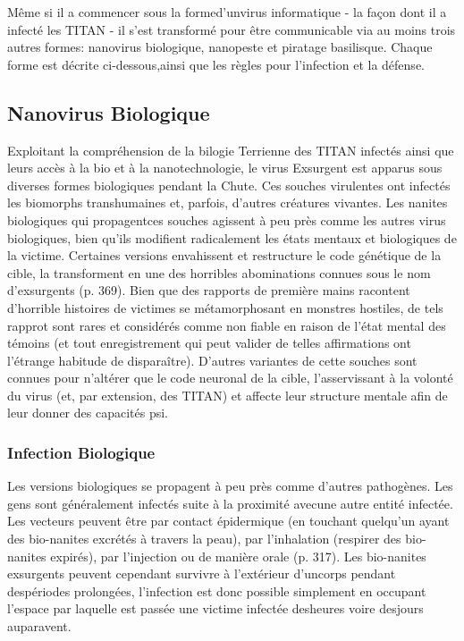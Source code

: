 Même si il a commencer sous la formed'unvirus informatique - la façon dont il a infecté les TITAN - il s'est transformé pour être communicable via au moins trois autres formes: nanovirus biologique, nanopeste et piratage basilisque. Chaque forme est décrite ci-dessous,ainsi que les règles pour l'infection et la défense. 

\subsection{Nanovirus Biologique} 

Exploitant la compréhension de la bilogie Terrienne des TITAN infectés ainsi que leurs accès à la bio et à la nanotechnologie, le virus Exsurgent est apparus sous diverses formes biologiques pendant la Chute. Ces souches virulentes ont infectés les biomorphs transhumaines et, parfois, d'autres créatures vivantes. Les nanites biologiques qui propagentces souches agissent à peu près comme les autres virus biologiques, bien qu'ils modifient radicalement les états mentaux et biologiques de la victime. Certaines versions envahissent et restructure le code génétique de la cible, la transforment en une des horribles abominations connues sous le nom d'exsurgents (p. 369). Bien que des rapports de première mains racontent d'horrible histoires de victimes se métamorphosant en monstres hostiles, de tels rapprot sont rares et considérés comme non fiable en raison de l'état mental des témoins (et tout enregistrement qui peut valider de telles affirmations ont l'étrange habitude de disparaître). D'autres variantes de cette souches sont connues pour n'altérer que le code neuronal de la cible, l'asservissant à la volonté du virus (et, par extension, des TITAN) et affecte leur structure mentale afin de leur donner des capacités psi. 

\subsubsection{Infection Biologique} 

Les versions biologiques se propagent à peu près comme d'autres pathogènes. Les gens sont généralement infectés suite à la proximité avecune autre entité infectée. Les vecteurs peuvent être par contact épidermique (en touchant quelqu'un ayant des bio-nanites excrétés à travers la peau), par l'inhalation (respirer des bio-nanites expirés), par l'injection ou de manière orale (p. 317). Les bio-nanites exsurgents peuvent cependant survivre à l'extérieur d'uncorps pendant despériodes prolongées, l'infection est donc possible simplement en occupant l'espace par laquelle est passée une victime infectée desheures voire desjours auparavent. 

